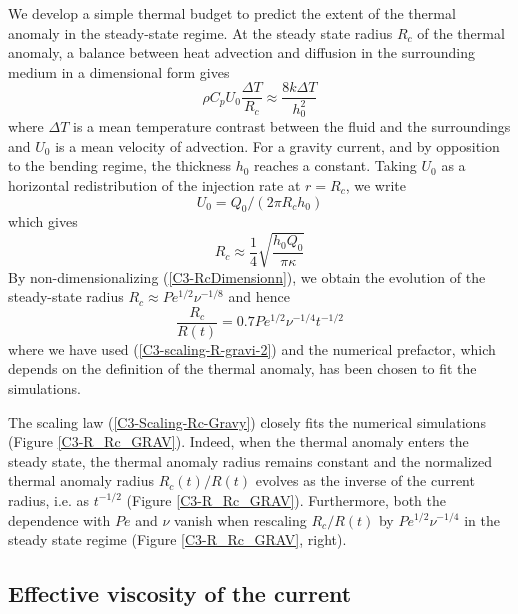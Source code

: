 We  develop a  simple  thermal budget  to predict  the  extent of  the
thermal  anomaly in  the  steady-state regime.   At  the steady  state
radius $R_c$ of the thermal  anomaly, a balance between heat advection
and diffusion in the surrounding medium in a dimensional form gives
\begin{equation}
  \rho C_p U_0 \frac{\Delta T}{R_c} \approx \frac{8 k \Delta T}{h_0^2}
\end{equation}
where $\Delta T$ is a mean  temperature contrast between the fluid and
the surroundings  and $U_0$ is  a mean  velocity of advection.   For a
gravity  current,  and  by  opposition  to  the  bending  regime,  the
thickness  $h_0$ reaches  a  constant. Taking  $U_0$  as a  horizontal
redistribution of the injection rate at $r=R_c$, we write
\begin{equation}
  U_0=Q_0/(2\pi R_c h_0)
\end{equation}
which gives
\begin{equation}
  R_c\approx\frac{1}{4}\sqrt{\frac{h_0 Q_0}{\pi \kappa}}
  \label{C3-RcDimensionn}
\end{equation}
By   non-dimensionalizing  (\ref{C3-RcDimensionn}),   we  obtain   the
evolution of the steady-state  radius $R_c \approx Pe^{1/2}\nu^{-1/8}$
and hence
\begin{equation}
  \frac{R_c}{R(t)} = 0.7Pe^{1/2}\nu^{-1/4}t^{-1/2}
  \label{C3-Scaling-Rc-Gravy}
\end{equation}
where  we have  used  (\ref{C3-scaling-R-gravi-2})  and the  numerical
prefactor, which depends on the definition of the thermal anomaly, has
been chosen to fit the simulations.

The scaling law (\ref{C3-Scaling-Rc-Gravy}) closely fits the numerical
simulations  (Figure \ref{C3-R_Rc_GRAV}).   Indeed,  when the  thermal
anomaly enters  the steady state,  the thermal anomaly  radius remains
constant  and  the  normalized thermal  anomaly  radius  $R_c(t)/R(t)$
evolves  as the  inverse of  the current  radius, i.e.   as $t^{-1/2}$
(Figure  \ref{C3-R_Rc_GRAV}).  Furthermore,  both the  dependence with
$Pe$    and    $\nu$    vanish   when    rescaling    $R_c/R(t)$    by
$Pe^{1/2}\nu^{-1/4}$    in   the    steady   state    regime   (Figure
\ref{C3-R_Rc_GRAV}, right).

\subsection{Effective viscosity of the current}
\label{C3-sec:effect-visc-blist-g}

